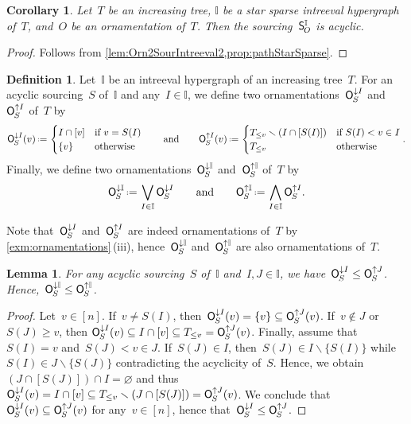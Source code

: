 \documentclass{amsart}
\newtheorem{corollary}[theorem]{Corollary}
\newtheorem{lemma}[theorem]{Lemma}
\theoremstyle{definition}
\newtheorem{definition}[theorem]{Definition}
\newcommand{\ssm}{\smallsetminus} %
\newcommand{\eqdef}{\mbox{\,\raisebox{0.2ex}{\scriptsize\ensuremath{\mathrm:}}\ensuremath{=}\,}} %
\newcommand{\bigMeet}{\bigwedge} %
\newcommand{\bigJoin}{\bigvee} %
\newcommand{\lessin}[2]{#1_{\le#2}} %
\newcommand{\mymap}[2]{\mathsf{#1}_{\hspace{-.7pt}#2}}
\newcommand{\minorn}[2]{\mymap{O}{#1}^{\downarrow#2}}  %
\newcommand{\maxorn}[2]{\mymap{O}{#1}^{\uparrow#2}}  %
\newcommand{\sour}[1]{\mymap{S}{#1}}  %
\newcommand{\II}{\mathbb I} %
\begin{document}
\begin{corollary}
\label{coro:Orn2SourIntreeval3}
Let~$T$ be an increasing tree, $\II$ be a star sparse intreeval hypergraph of~$T$, and~$O$ be an ornamentation of~$T$.
Then the sourcing~$\sour{O}^\II$ is acyclic.
\end{corollary}

\begin{proof}
Follows from \cref{lem:Orn2SourIntreeval2,prop:pathStarSparse}.
\end{proof}


\begin{definition}
Let~$\II$ be an intreeval hypergraph of an increasing tree~$T$.
For an acyclic sourcing~$S$ of~$\II$ and any~$I \in \II$, we define two ornamentations~$\minorn{S}{I}$ and~$\maxorn{S}{I}$ of~$T$ by
\[
\minorn{S}{I}(v) \eqdef \begin{cases} I \cap [v] & \text{if } v = S(I) \\ \{v\} & \text{otherwise} \end{cases}
\qquad\text{and}\qquad
\maxorn{S}{I}(v) \eqdef  \begin{cases} \lessin{T}{v} \ssm (I \cap [S(I)]) & \text{if } S(I) < v \in I \\ \lessin{T}{v} & \text{otherwise} \end{cases}
.
\]
Finally, we define two ornamentations~$\minorn{S}{\II}$ and~$\maxorn{S}{\II}$ of~$T$ by
\[
\minorn{S}{\II} \eqdef \bigJoin_{I \in \II} \minorn{S}{I}
\qquad\text{and}\qquad
\maxorn{S}{\II} \eqdef \bigMeet_{I \in \II} \maxorn{S}{I}
.
\]
\end{definition}

Note that~$\minorn{S}{I}$ and~$\maxorn{S}{I}$ are indeed ornamentations of~$T$ by \cref{exm:ornamentations}\,(iii), hence~$\minorn{S}{\II}$ and~$\maxorn{S}{\II}$ are also ornamentations of~$T$.

\begin{lemma}
\label{lem:Sour2OrnIntreeval1}
For any acyclic sourcing~$S$ of~$\II$ and~$I, J \in \II$, we have~$\minorn{S}{I} \le \maxorn{S}{J}$.
Hence,~$\minorn{S}{\II} \le \maxorn{S}{\II}$.
\end{lemma}

\begin{proof}
Let~$v \in [n]$.
If~$v \ne S(I)$, then~$\minorn{S}{I}(v) = \{v\} \subseteq \maxorn{S}{J}(v)$.
If~$v \notin J$ or~$S(J) \ge v$, then ${\minorn{S}{I}(v) \subseteq I \cap [v] \subseteq \lessin{T}{v} = \maxorn{S}{J}(v)}$.
Finally, assume that~$S(I) = v$ and~$S(J) < v \in J$.
If~$S(J) \in I$, then~$S(J) \in I \ssm \{S(I)\}$ while~$S(I) \in J \ssm \{S(J)\}$ contradicting the acyclicity of~$S$.
Hence, we obtain~$(J \cap [S(J)]) \cap I = \varnothing$ and thus~$\minorn{S}{I}(v) = I \cap [v] \subseteq \lessin{T}{v} \ssm (J \cap [S(J)])= \maxorn{S}{J}(v)$.
We conclude that~$\minorn{S}{I}(v) \subseteq \maxorn{S}{J}(v)$ for any~$v \in [n]$, hence that~$\minorn{S}{I} \le \maxorn{S}{J}$.
\end{proof}
\end{document}
